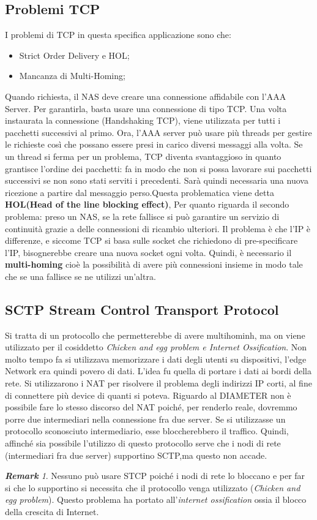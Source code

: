 \documentclass{article}
\theoremstyle{remark}
\newtheorem*{remark}{\textbf{Remark}}
\begin{document}
\subsection{Problemi TCP}
I problemi di TCP in questa specifica applicazione sono che:\begin{itemize}
	\item Strict Order Delivery e HOL;
	\item Mancanza di Multi-Homing;
\end{itemize}
Quando richiesta, il NAS deve creare una connessione affidabile con l'AAA Server. Per garantirla, basta usare una connessione di tipo TCP. Una volta instaurata la connessione (Handshaking TCP), viene utilizzata per tutti i pacchetti successivi al primo. Ora, l'AAA server può usare più threads per gestire le richieste così che possano essere presi in carico diversi messaggi alla volta. Se un thread si ferma per un problema, TCP diventa svantaggioso in quanto grantisce l'ordine dei pacchetti: fa in modo che non si possa lavorare sui pacchetti successivi se non sono stati serviti i precedenti. Sarà quindi necessaria una nuova ricezione a partire dal messaggio perso.\newline Questa problematica viene detta \textbf{HOL(Head of the line blocking effect)},\newline
Per quanto riguarda il secondo problema: preso un NAS, se la rete fallisce si può garantire un servizio di continuità grazie a delle connessioni di ricambio ulteriori. Il problema è che l'IP è differenze, e siccome TCP si basa sulle socket che richiedono di pre-specificare l'IP, bisognerebbe creare una nuova socket ogni volta. Quindi, è necessario il \textbf{multi-homing} cioè la possibilità di avere più connessioni insieme in modo tale che se una fallisce se ne utilizzi un'altra.
\subsection{SCTP Stream Control Transport Protocol}
Si tratta di un protocollo che permetterebbe di avere multihominh, ma on viene utilizzato per il cosiddetto \emph{Chicken and egg problem e Internet Ossification}.\newline
Non molto tempo fa si utilizzava memorizzare i dati degli utenti su dispositivi, l'edge Network era quindi povero di dati. L'idea fu quella di portare i dati ai bordi della rete. Si utilizzarono i NAT per risolvere il problema degli indirizzi IP corti, al fine di connettere più device di quanti si poteva. Riguardo al DIAMETER non è possibile fare lo stesso discorso del NAT poiché, per renderlo reale, dovremmo porre due intermediari nella connessione fra due server. Se si utilizzasse un protocollo sconosciuto intermediario, esse bloccherebbero il traffico. Quindi, affinché sia possibile l'utilizzo di questo protocollo serve che i nodi di rete (intermediari fra due server) supportino SCTP,ma questo non accade.\begin{remark}
	Nessuno può usare STCP poiché i nodi di rete lo bloccano e per far si che lo supportino si necessita che il protocollo venga utilizzato (\emph{Chicken and egg problem}). Questo problema ha portato all'\emph{internet ossification} ossia il blocco della crescita di Internet.
\end{remark}
\end{document}
